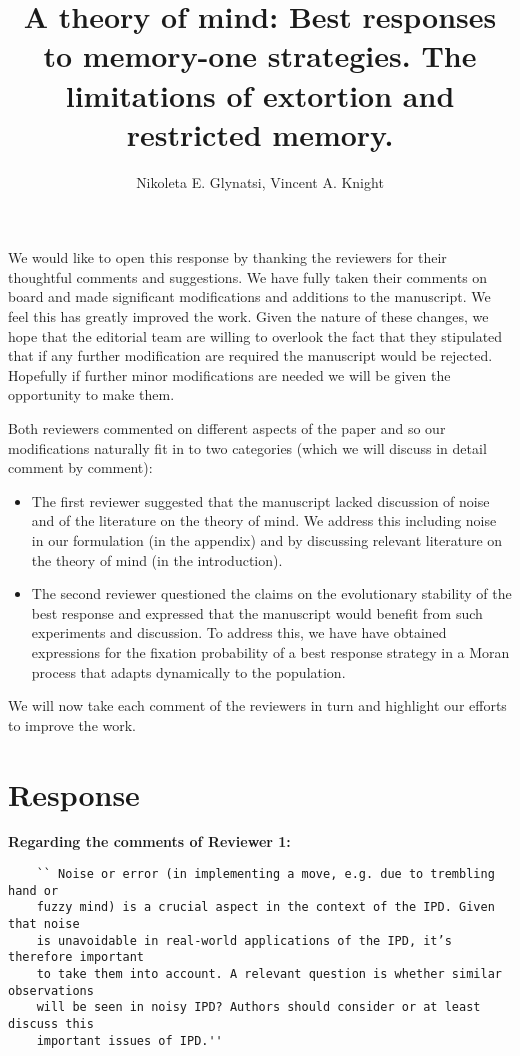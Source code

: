\documentclass{article}
\title{A theory of mind: Best responses to memory-one strategies. The limitations
of extortion and restricted memory.}
\author{Nikoleta E. Glynatsi, Vincent A. Knight}
\begin{document}
\maketitle

We would like to open this response by thanking the reviewers for their
thoughtful comments and suggestions. We have fully taken their comments on board
and made significant modifications and additions to the manuscript.
We feel this has greatly improved the work. Given the nature of these changes,
we hope that the editorial team are willing to overlook the fact that
they stipulated that if any further modification are required the manuscript
would be rejected. Hopefully if further minor modifications are needed we will
be given the opportunity to make them.

Both reviewers commented on different aspects of the paper and so our
modifications naturally fit in to two categories (which we will discuss in
detail comment by comment):

\begin{itemize}
    \item The first reviewer suggested that the manuscript lacked discussion of
    noise and of the literature on the theory of mind. We address
    this including noise in our formulation (in the appendix) and by discussing
    relevant literature on the theory of mind (in the introduction).
    \item The second reviewer questioned the claims on the evolutionary
    stability of the best response and expressed that the manuscript would
    benefit from such experiments and discussion. To address this, we have
    have obtained expressions for the fixation probability of a best response
    strategy in a Moran process that adapts dynamically to the population.
\end{itemize}

We will now take each comment of the reviewers in turn and highlight our efforts
to improve the work.

\section{Response}

\textbf{Regarding the comments of Reviewer 1:}

\begin{verbatim}
    `` Noise or error (in implementing a move, e.g. due to trembling hand or
    fuzzy mind) is a crucial aspect in the context of the IPD. Given that noise
    is unavoidable in real-world applications of the IPD, it’s therefore important
    to take them into account. A relevant question is whether similar observations
    will be seen in noisy IPD? Authors should consider or at least discuss this
    important issues of IPD.''
\end{verbatim}
\end{document}

